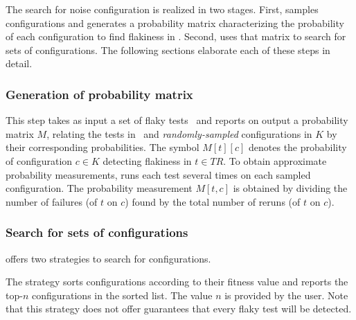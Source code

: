 \documentclass[conference]{IEEEtran}
\begin{document}
The search for noise configuration is realized in two stages. First, \tname{} samples configurations and generates a probability matrix characterizing the probability of each configuration to find flakiness in \tr. Second, \tname{} uses that matrix to search for sets of configurations. The following sections elaborate each of these steps in detail.

\subsubsection{Generation of probability matrix}
This step takes as input a set of flaky tests \tr\ and reports on output a probability matrix $M$, relating the tests in \tr\ and \emph{randomly-sampled} configurations in $K$ by their corresponding probabilities. The symbol $M[t][c]$ denotes the probability of configuration $c\in{}K$ detecting flakiness in $t\in{}\mathit{TR}$. To obtain approximate probability measurements, \tname{} runs each test several times on each sampled configuration. The probability measurement $M[t,c]$ is obtained by dividing the number of failures (of $t$ on $c$) found by the total number of reruns (of $t$ on $c$).


\subsubsection{\label{sec:search-configs}Search for sets of configurations} \tname{} offers two strategies to search for configurations. %

The \textbf{\greedy{}} strategy sorts configurations according to their fitness value and  reports the top-$n$ configurations in the sorted list. The value $n$ is provided by the user. Note that this strategy does not offer guarantees that every flaky test will be detected. 
\end{document}
